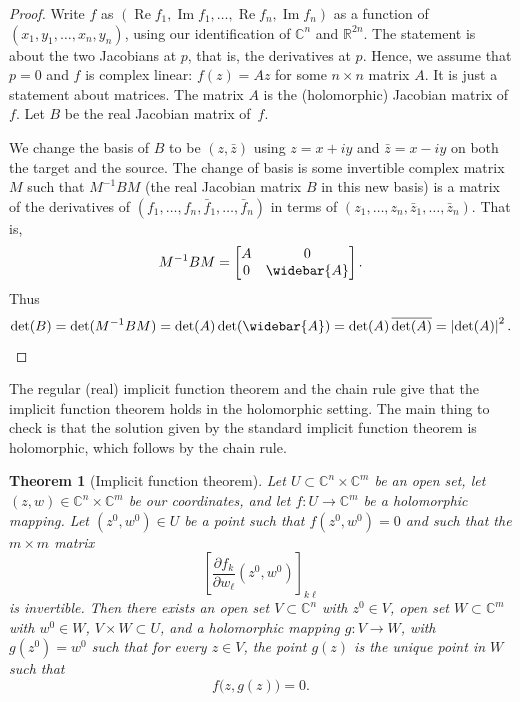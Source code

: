 \documentclass[12pt,openany]{book}
\renewcommand{\Re}{\operatorname{Re}}
\renewcommand{\Im}{\operatorname{Im}}
\newcommand{\abs}[1]{\left\lvert {#1} \right\rvert}
\newcommand{\C}{{\mathbb{C}}}
\newcommand{\R}{{\mathbb{R}}}
\theoremstyle{plain}
\newtheorem{thm}{Theorem}[section]
\theoremstyle{remark}
\theoremstyle{definition}
\theoremstyle{exercise}
\theoremstyle{example}
\begin{document}
\begin{proof}
Write $f$ as
$(\Re f_1,\Im f_1, \ldots, \Re f_n, \Im f_n)$
as a function of $(x_1,y_1,\ldots,x_n,y_n)$,
using our identification of $\C^n$ and $\R^{2n}$.
The statement is about the two Jacobians at $p$, that is, the derivatives
at $p$.  Hence, we assume that
$p=0$ and $f$ is complex linear: $f(z) = Az$ for some $n \times n$
matrix $A$.  It is just a statement about matrices.
The matrix $A$ is the (holomorphic) Jacobian matrix of $f$.
Let $B$ be the real Jacobian matrix of~$f$.

We change the basis of $B$ to be $(z,\bar{z})$
using $z = x+iy$ and $\bar{z}=x-iy$
on both the target and the source.
The change of basis is some invertible
complex matrix $M$ such that
$M^{-1} B M$ (the real Jacobian matrix $B$ in this new basis)
is a matrix of the derivatives of
$(f_1,\ldots,f_n,\bar{f}_1,\ldots,\bar{f}_n)$
in terms of
$(z_1,\ldots,z_n,\bar{z}_1,\ldots,\bar{z}_n)$.
That is,
\begin{equation*}
M^{-1} B M =
\begin{bmatrix}
A & 0 \\
0 & \widebar{A}
\end{bmatrix} .
\end{equation*}
Thus
\begin{equation*}
\det (B) =
\det(M^{-1} B M)
=
\det(A) \det(\widebar{A})
=
\det(A) \, \overline{\det(A)}
=
\abs{\det(A)}^2 .  \qedhere
\end{equation*}
\end{proof}

The regular (real) implicit function theorem and the chain rule
give that the implicit function theorem holds in the holomorphic setting.
The main thing to check is that the solution given by the
standard implicit function theorem is holomorphic, which follows by the
chain rule.

\begin{thm}[Implicit function theorem]\label{thm:ift}%
\pagebreak[2]
Let $U \subset \C^{n} \times \C^{m}$ be an open set, let $(z,w) \in \C^n \times
\C^m$ be our coordinates, and let $f \colon U \to \C^m$
be a holomorphic mapping.  Let $(z^0,w^0) \in U$ be a point such that
$f(z^0,w^0) = 0$ and such that the $m \times m$ matrix
\begin{equation*}
\left[
\frac{\partial f_k}{\partial w_\ell} (z^0,w^0)
\right]_{k\ell}
\end{equation*}
is invertible.
Then there exists an
open set $V \subset \C^n$ with $z^0 \in V$,
open set $W \subset \C^m$ with $w^0 \in W$,
$V \times W \subset U$,
and
a holomorphic
mapping $g \colon V \to W$, with $g(z^0) = w^0$
such that
for every $z \in V$, the point $g(z)$ is the unique point in $W$
such that
\begin{equation*}
f\bigl(z,g(z)\bigr) = 0 .
\end{equation*}
\end{thm}
\end{document}
